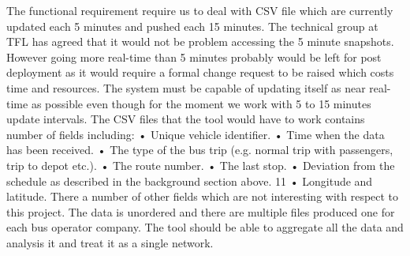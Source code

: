 The functional requirement require us to deal with CSV file which are currently
updated each 5 minutes and pushed each 15 minutes. The technical
group at TFL has agreed that it would not be problem accessing the 5 minute
snapshots. However going more real-time than 5 minutes probably would be
left for post deployment as it would require a formal change request to be raised
which costs time and resources. The system must be capable of updating itself
as near real-time as possible even though for the moment we work with 5 to
15 minutes update intervals.
The CSV files that the tool would have to work contains number of fields
including:
• Unique vehicle identifier.
• Time when the data has been received.
• The type of the bus trip (e.g. normal trip with passengers, trip to depot
etc.).
• The route number.
• The last stop.
• Deviation from the schedule as described in the background section above.
11
• Longitude and latitude.
There a number of other fields which are not interesting with respect to this
project. The data is unordered and there are multiple files produced one for
each bus operator company. The tool should be able to aggregate all the data
and analysis it and treat it as a single network.